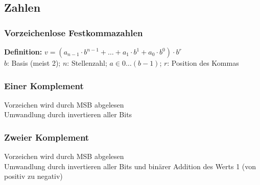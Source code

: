 \documentclass[german, threecolumn, 8pt]{latex4ei/latex4ei_sheet}
\begin{document}
	\subsection{Zahlen}
	\subsubsection{Vorzeichenlose Festkommazahlen}
	\textbf{Definition:} $v=(a_{n-1} \cdot b^{n-1}+\dots+a_1 \cdot b^1 + a_0 \cdot b^0) \cdot b^r$\\
	$b$: Basis (meist 2); $n$: Stellenzahl; $a \in 0 \dots (b-1)$; $r$: Position des Kommas
	\subsubsection{Einer Komplement}
	Vorzeichen wird durch MSB abgelesen\\
	Umwandlung durch invertieren aller Bits
	\subsubsection{Zweier Komplement}
	Vorzeichen wird durch MSB abgelesen\\
	Umwandlung durch invertieren aller Bits und binärer Addition des Werts 1 (von positiv zu negativ)
\end{document}

